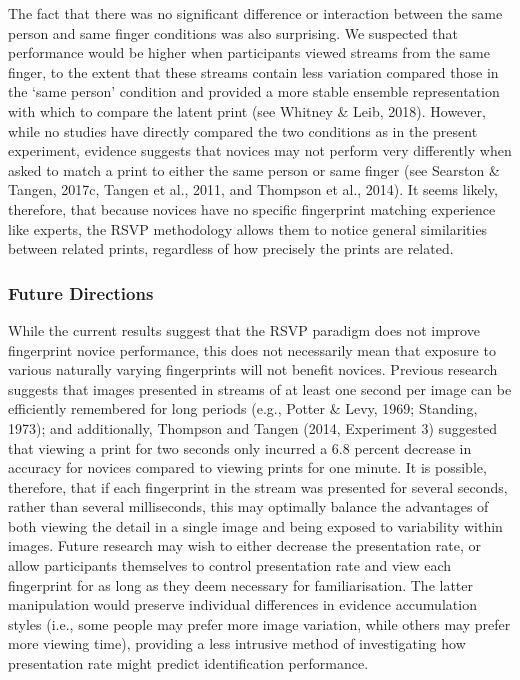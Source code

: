 \documentclass[
  english,
  man]{apa6}
\begin{document}
The fact that there was no significant difference or interaction between the same person and same finger conditions was also surprising. We suspected that performance would be higher when participants viewed streams from the same finger, to the extent that these streams contain less variation compared those in the `same person' condition and provided a more stable ensemble representation with which to compare the latent print (see Whitney \& Leib, 2018). However, while no studies have directly compared the two conditions as in the present experiment, evidence suggests that novices may not perform very differently when asked to match a print to either the same person or same finger (see Searston \& Tangen, 2017c, Tangen et al., 2011, and Thompson et al., 2014). It seems likely, therefore, that because novices have no specific fingerprint matching experience like experts, the RSVP methodology allows them to notice general similarities between related prints, regardless of how precisely the prints are related.

\hypertarget{future-directions}{%
\subsubsection{Future Directions}\label{future-directions}}

While the current results suggest that the RSVP paradigm does not improve fingerprint novice performance, this does not necessarily mean that exposure to various naturally varying fingerprints will not benefit novices. Previous research suggests that images presented in streams of at least one second per image can be efficiently remembered for long periods (e.g., Potter \& Levy, 1969; Standing, 1973); and additionally, Thompson and Tangen (2014, Experiment 3) suggested that viewing a print for two seconds only incurred a 6.8 percent decrease in accuracy for novices compared to viewing prints for one minute. It is possible, therefore, that if each fingerprint in the stream was presented for several seconds, rather than several milliseconds, this may optimally balance the advantages of both viewing the detail in a single image and being exposed to variability within images. Future research may wish to either decrease the presentation rate, or allow participants themselves to control presentation rate and view each fingerprint for as long as they deem necessary for familiarisation. The latter manipulation would preserve individual differences in evidence accumulation styles (i.e., some people may prefer more image variation, while others may prefer more viewing time), providing a less intrusive method of investigating how presentation rate might predict identification performance.
\end{document}
